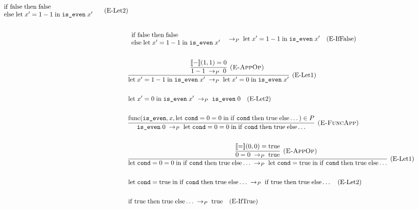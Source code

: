 \begin{align*}
{\begin{array}{l}
        \If{\; \false \;}{\; \false \\ }{\; \Let{\; x'}{1-1 \;}{\; \App{\code{is\_even}}{x'\; }}}
      \end{array}} \quad\ERuleLetSubst \\\\
  & \Reduce{P}
      {\begin{array}{l}
        \If{\; \false \;}{\; \false \\ }{\; \Let{\; x'}{1-1 \;}{\; \App{\code{is\_even}}{x'\; }}}
      \end{array}}
      {\Let{\; x'}{1-1 \;}{\; \App{\code{is\_even}}{x'}}}
      \quad \ERuleIfFalse \\\\
  & \infer[\ERuleLetCtx] {
    \Reduce{P}
      {\Let{\; x'}{1-1 \;}{\; \App{\code{is\_even}}{x'}}}
      {\Let{\; x'}{0 \;}{\; \App{\code{is\_even}}{x'}}}
  } {
    \infer[\ERuleAppOp] {
      \Reduce{P}{1-1}{0}
    } {
      \sem{-}\paren{1, 1} = 0
    }
  } \\\\
  & \Reduce{P}
      {\Let{\; x'}{0 \;}{\; \App{\code{is\_even}}{x'}}}
      {\App{\code{is\_even}}{0}}
      \quad \ERuleLetSubst \\\\
  & \infer[\ERuleAppFunc] {
    \Reduce{P}
      {\App{\code{is\_even}}{0}}
      {\Let{\; \code{cond}}{0 = 0 \;}{\; \If{\; \code{cond} \;}{\; \true \;}{\dots}}}
  } {
    \Func
      {\code{is\_even}}{x}
      {\Let{\; \code{cond}}{0 = 0 \;}{\; \If{\; \code{cond} \;}{\; \true \;}{\dots}}}
      \in P
  } \\\\
  & \infer[\ERuleLetCtx] {
    \Reduce{P}
      {\Let{\; \code{cond} }{0=0 \;}{\; \If{\; \code{cond} \;}{\; \true \;}{\dots}}}
      {\Let{\; \code{cond} }{\true \;}{\; \If{\; \code{cond} \;}{\; \true \;}{\dots}}}
  } {
    \infer[\ERuleAppOp] {
      \Reduce{P}{0=0}{\true}
    } {
      \sem{=}\paren{0, 0} = \true
    }
  } \\\\
  & \Reduce{P}
      {\Let{\; \code{cond} }{\true \;}{\; \If{\; \code{cond} \;}{\; \true \;}{\dots}}}
      {\If{\; \true \;}{\; \true \;}{\dots}} \quad\ERuleLetSubst \\\\
  & \Reduce{P}
      {\If{\; \true \;}{\; \true \;}{\dots}}
      {\true} \quad\ERuleIfTrue
\end{align*}
